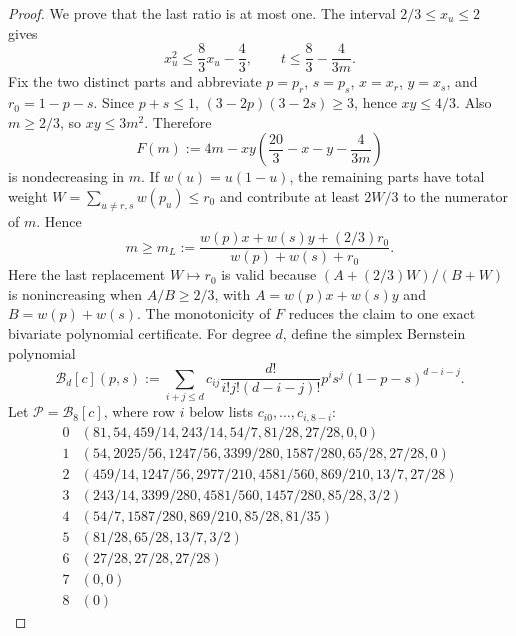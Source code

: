 \documentclass[11pt]{article}
\begin{document}
\begin{proof}
We prove that the last ratio is at most one.  The interval
$2/3\leq x_u\leq2$ gives
\begin{equation}
 x_u^2\leq\frac83x_u-\frac43,
 \qquad
 t\leq\frac83-\frac{4}{3m}.
 \label{eq:psi-kmultipartite-t-bound}
\end{equation}
Fix the two distinct parts and abbreviate $p=p_r$, $s=p_s$, $x=x_r$,
$y=x_s$, and $r_0=1-p-s$.  Since $p+s\leq1$,
$(3-2p)(3-2s)\geq3$, hence $xy\leq4/3$.  Also $m\geq2/3$, so
$xy\leq3m^2$.  Therefore
\begin{equation}
 F(m):=4m-xy\left(\frac{20}{3}-x-y-\frac{4}{3m}\right)
 \label{eq:psi-kmultipartite-f}
\end{equation}
is nondecreasing in $m$.  If $w(u)=u(1-u)$, the remaining parts have total
weight $W=\sum_{u\neq r,s}w(p_u)\leq r_0$ and contribute at least
$2W/3$ to the numerator of $m$.  Hence
\begin{equation}
 m\geq m_L
 :=\frac{w(p)x+w(s)y+(2/3)r_0}{w(p)+w(s)+r_0}.
 \label{eq:psi-kmultipartite-ml}
\end{equation}
Here the last replacement $W\mapsto r_0$ is valid because
$(A+(2/3)W)/(B+W)$ is nonincreasing when $A/B\geq2/3$, with
$A=w(p)x+w(s)y$ and $B=w(p)+w(s)$.
The monotonicity of $F$ reduces the claim to one exact bivariate polynomial
certificate.  For degree $d$, define the simplex Bernstein polynomial
\begin{equation}
 \mathcal B_d[c](p,s)
 :=\sum_{i+j\leq d}c_{ij}\frac{d!}{i!j!(d-i-j)!}
 p^is^j(1-p-s)^{d-i-j}.
 \label{eq:psi-simplex-bernstein}
\end{equation}
Let $\mathcal P=\mathcal B_8[c]$, where row $i$ below lists
$c_{i0},\ldots,c_{i,8-i}$:
{\scriptsize
\begin{equation}
\begin{array}{c|l}
0&(81,54,459/14,243/14,54/7,81/28,27/28,0,0)\\
1&(54,2025/56,1247/56,3399/280,1587/280,65/28,27/28,0)\\
2&(459/14,1247/56,2977/210,4581/560,869/210,13/7,27/28)\\
3&(243/14,3399/280,4581/560,1457/280,85/28,3/2)\\
4&(54/7,1587/280,869/210,85/28,81/35)\\
5&(81/28,65/28,13/7,3/2)\\
6&(27/28,27/28,27/28)\\
7&(0,0)\\
8&(0)
\end{array}
\label{eq:psi-kmultipartite-p-coefficients}
\end{equation}
}
\end{proof}
\end{document}
